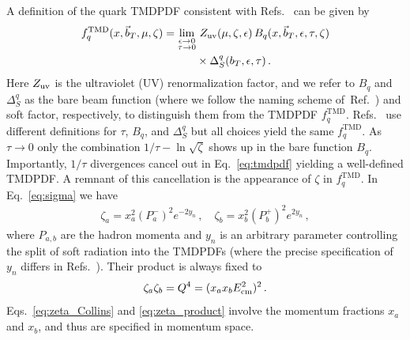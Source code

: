 \documentclass[prd,aps,twocolumn,bibnotes,nofootinbib,preprintnumbers,floatfix]{revtex4-1}
\DeclareRobustCommand{\eq}[1]{Eq.~\eqref{eq:#1}}
\DeclareRobustCommand{\eqs}[2]{Eqs.~\eqref{eq:#1} and \eqref{eq:#2}}
\DeclareRobustCommand{\mycite}[1]{Ref.~\cite{#1}}
\DeclareRobustCommand{\mycites}[1]{Refs.~\cite{#1}}
\newcommand{\eps}{\epsilon}
\newcommand{\nn}{\nonumber}
\newcommand{\Ecm}{E_{\rm cm}}
\newcommand{\bt}{\vec b_T}
\newcommand\TMD{\mathrm{TMD}}
\begin{document}
A definition of the quark TMDPDF consistent with Refs.~\cite{Collins:1350496,Chiu:2012ir,GarciaEchevarria:2011rb} can be given by
\begin{align}
 \label{eq:tmdpdf}
 f^\TMD_q(x, \bt, \mu , \zeta) &=  \lim_{\substack{\epsilon\to 0 \\ \tau\to 0} }\,
 Z_{\rm uv}(\mu,\zeta,\eps)\,
  B_{q}(x, \bt, \eps, \tau, \zeta)
  \nn\\
  &\qquad\quad \times \Delta_S^q(b_T,\eps,\tau) 
\,.\end{align}
Here $Z_{\rm uv}$ is the ultraviolet (UV) renormalization factor, and we refer to $B_{q}$ and $\Delta^q_{S}$ as the bare beam function (where we follow the naming scheme of~\mycite{Stewart:2009yx}) and soft factor, respectively, to distinguish them from the TMDPDF $f_q^\TMD$.  \mycites{Collins:1350496,Chiu:2012ir,GarciaEchevarria:2011rb} use different definitions for $\tau$, $B_{q}$, and $\Delta_S^q$ but all choices yield the same $f_q^\TMD$. As $\tau\to 0$ only the combination $1/\tau - \ln\sqrt{\zeta}$ shows up in the bare function $B_{q}$. Importantly, $1/\tau$ divergences cancel out in \eq{tmdpdf} yielding a well-defined TMDPDF. A remnant of this cancellation is the appearance of $\zeta$ in $f_{q}^\TMD$. In \eq{sigma} we have
\begin{align} \label{eq:zeta_Collins}
\zeta_a = x_a^2 (P_a^-)^2 e^{-2y_n} \,,\quad \zeta_b = x_b^2 (P_b^+)^2 e^{2y_n}
\,,\end{align}
where $P_{a,b}$ are the hadron momenta and $y_n$ is an arbitrary parameter controlling the split of soft radiation into the TMDPDFs (where the precise specification of $y_n$ differs in \mycites{Collins:1350496,Chiu:2012ir,GarciaEchevarria:2011rb}).
Their product is always fixed to
\begin{equation} \label{eq:zeta_product}
\zeta_a \zeta_b = Q^4 = (x_a x_b \Ecm^2)^2
\,.
\end{equation}
\eqs{zeta_Collins}{zeta_product} involve the momentum fractions $x_a$ and $x_b$,
and thus are specified in momentum space.
\end{document}
